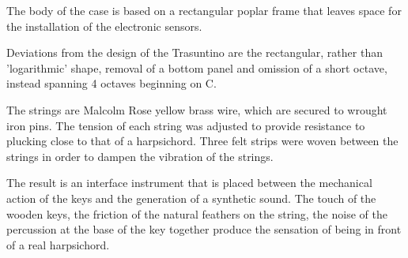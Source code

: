 The body of the case is based on a rectangular poplar frame that leaves space
for the installation of the electronic sensors.

Deviations from the design of the Trasuntino are the rectangular, rather than
'logarithmic' shape, removal of a bottom panel and omission of a short octave,
instead spanning 4 octaves beginning on C.

The strings are Malcolm Rose yellow brass wire, which are secured to wrought
iron pins. The tension of each string was adjusted to provide resistance to
plucking close to that of a harpsichord. Three felt strips were woven between
the strings in order to dampen the vibration of the strings.

The result is an interface instrument that is placed between the mechanical
action of the keys and the generation of a synthetic sound. The touch of the
wooden keys, the friction of the natural feathers on the string, the noise of
the percussion at the base of the key together produce the sensation of being in
front of a real harpsichord.






